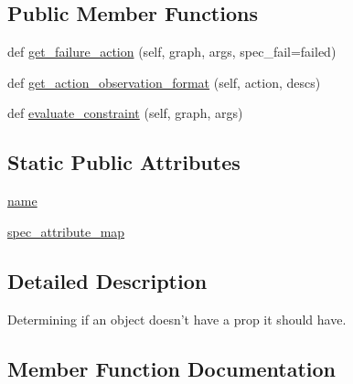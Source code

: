 \subsection*{Public Member Functions}
\begin{DoxyCompactItemize}
\item 
def \hyperlink{classlight__chats_1_1graph_1_1HasPropConstraint_aff9fe175fee6b71e845e03433593814c}{get\+\_\+failure\+\_\+action} (self, graph, args, spec\+\_\+fail=\textquotesingle{}failed\textquotesingle{})
\item 
def \hyperlink{classlight__chats_1_1graph_1_1HasPropConstraint_a306f2581a6d32cec3edd07fda539429a}{get\+\_\+action\+\_\+observation\+\_\+format} (self, action, descs)
\item 
def \hyperlink{classlight__chats_1_1graph_1_1HasPropConstraint_a02fd1d0ec2da38cecbe274d0de49e993}{evaluate\+\_\+constraint} (self, graph, args)
\end{DoxyCompactItemize}
\subsection*{Static Public Attributes}
\begin{DoxyCompactItemize}
\item 
\hyperlink{classlight__chats_1_1graph_1_1HasPropConstraint_a82dbfb2fb15ed5d9e475a1abeccc2e70}{name}
\item 
\hyperlink{classlight__chats_1_1graph_1_1HasPropConstraint_a7157789f0a8c670ce06d73e7022c35a6}{spec\+\_\+attribute\+\_\+map}
\end{DoxyCompactItemize}


\subsection{Detailed Description}
\begin{DoxyVerb}Determining if an object doesn't have a prop it should have.
\end{DoxyVerb}
 

\subsection{Member Function Documentation}
\mbox{\label{classlight__chats_1_1graph_1_1HasPropConstraint_a02fd1d0ec2da38cecbe274d0de49e993}} 
